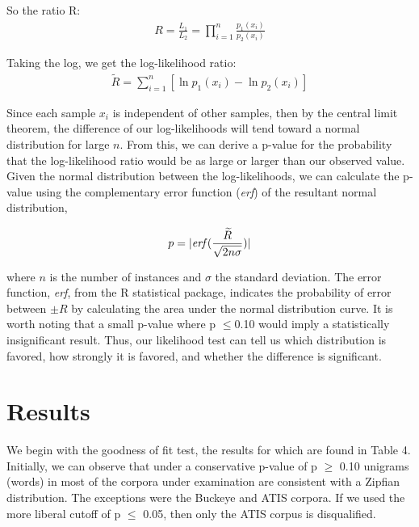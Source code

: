 \documentclass[12pt]{article}
\begin{document}
So the ratio R:
\begin{align*}
R = \frac{L_{1}}{L_{2}} = \prod_{i=1}^{n}\frac{p_{1}(x_i)}{p_{2}(x_i)}
\end{align*}

Taking the log, we get the log-likelihood ratio:
\begin{align*}
\widetilde{R} = \sum_{i=1}^{n}\left[\ln p_{1}(x_i)-\ln p_{2}(x_i)\right]
\end{align*}

Since each sample $x_{i}$ is independent of other samples, then by the central limit theorem, the difference of our log-likelihoods will tend toward a normal distribution for large $n$.  From this, we can derive a p-value for the probability that the log-likelihood ratio would be as large or larger than our observed value. Given the normal distribution between the log-likelihoods, we can calculate the p-value using the complementary error function (\emph{erf}) of the resultant normal distribution, 

\begin{align*}
p = |\textrm{\emph{erf}}(\frac{\widetilde{R}}{\sqrt{2n\sigma}})|
\end{align*}

\noindent where $n$ is the number of instances and $\sigma$ the standard deviation.  The error function, \emph{erf}, from the R statistical package, indicates the probability of error between $\pm{R}$ by calculating the area under the normal distribution curve.   It is worth noting that a small p-value where p $\leq$0.10 would imply a statistically insignificant result. Thus, our likelihood test can tell us which distribution is favored, how strongly it is favored, and whether the difference is significant.

\section{Results}

We begin with the goodness of fit test, the results for which are found in Table 4.  Initially, we can observe that under a conservative p-value of p $\geq$ 0.10 unigrams (words) in most of the corpora under examination are consistent with a Zipfian distribution. The exceptions were the Buckeye and ATIS corpora. If we used the more liberal cutoff of p $\leq$ 0.05, then only the ATIS corpus is disqualified.
\end{document}
